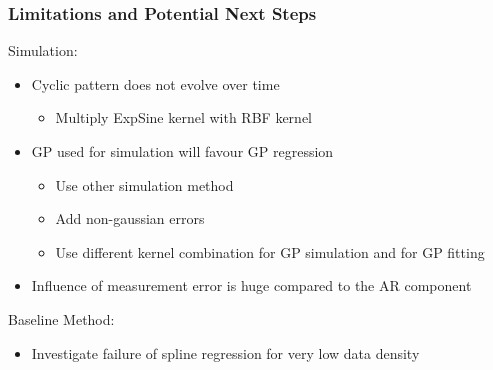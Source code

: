 \documentclass[
	8pt, %
]{beamer}
\begin{document}
\begin{frame}
	\frametitle{Limitations and Potential Next Steps}

	Simulation:
	\begin{itemize}
		\item Cyclic pattern does not evolve over time
		\begin{itemize}
			\item Multiply ExpSine kernel with RBF kernel
		\end{itemize}
		\item GP used for simulation will favour GP regression
		\begin{itemize}
			\item Use other simulation method
			\item Add non-gaussian errors
			\item Use different kernel combination for GP simulation and for
			GP fitting
		\end{itemize}
		\item Influence of measurement error is huge compared to the AR component
	\end{itemize}

	\bigskip

	Baseline Method:
	\begin{itemize}
		\item Investigate failure of spline regression for very low data density
	\end{itemize}

\end{frame}




%
%
\end{document}
